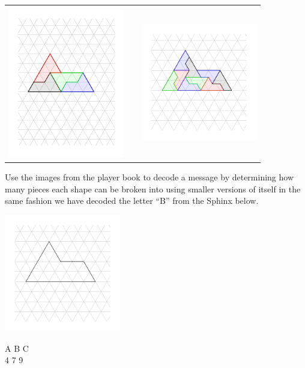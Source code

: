 \documentclass{article}
\begin{document}
\begin{flushleft}
\begin{center}
\begin{tabular}{c c c}
\includegraphics[width=2in]{Sphinx4.pdf} &  \hspace{1in} & \includegraphics[width=2in]{Sphinx9.pdf}
\end{tabular}
\end{center}

Use the images from the player book to decode a message by determining how many pieces each shape can be broken into using smaller versions of itself in the same fashion we have decoded the letter ``B'' from the Sphinx below.

\begin{center}
\includegraphics[width=2in]{Sphinx.pdf}

A \hspace{0.5in} B \hspace{0.5in} C \\
4 \hspace{0.54in} 7 \hspace{0.54in} 9


\end{center}
\end{flushleft}
\end{document}
